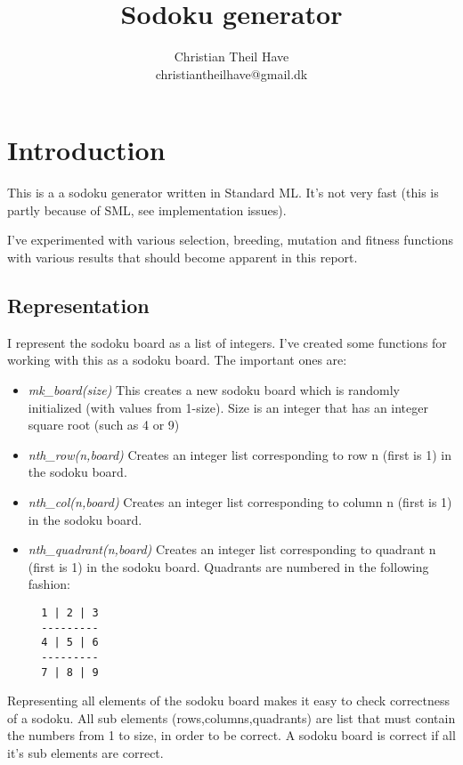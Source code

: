 \documentclass{article}
\author{Christian Theil Have\\christiantheilhave@gmail.dk}
\title{Sodoku generator}
\begin{document}
\maketitle

\section{Introduction}

This is a a sodoku generator written in Standard ML.
It's not very fast (this is partly because of SML, see
implementation issues).

I've experimented with various selection, breeding, 
mutation and fitness functions with various results
that should become apparent in this report.

\subsection{Representation}

I represent the sodoku board as a list of integers. I've 
created some functions for working with this as a sodoku 
board. The important ones are:

\begin{itemize}
\item 
  \emph{mk\_board(size)} This creates a new sodoku board which
  is randomly initialized (with values from 1-size). Size is an
  integer that has an integer square root (such as 4 or 9) 
\item \emph{nth\_row(n,board)} 
    Creates an integer list corresponding to row n (first is 1) in the
    sodoku board. 
\item \emph{nth\_col(n,board)}
    Creates an integer list corresponding to column n (first is 1) in the
    sodoku board. 
\item \emph{nth\_quadrant(n,board)}
    Creates an integer list corresponding to quadrant n (first is 1) in the
    sodoku board. Quadrants are numbered in the following fashion:
\begin{verbatim}
  1 | 2 | 3
  ---------  
  4 | 5 | 6
  ---------
  7 | 8 | 9
\end{verbatim}

\end{itemize}

Representing all elements of the sodoku board makes it easy to check
correctness of a sodoku. All sub elements (rows,columns,quadrants) are
list that must contain the numbers from 1 to size, in order to be
correct. A sodoku board is correct if all it's sub elements are
correct.
\end{document}
